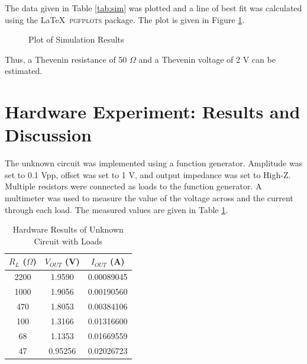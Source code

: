 \documentclass[EEEE]{KGCOEReport}
\begin{document}
The data given in Table \ref{tab:sim} was plotted and a line of best fit was
calculated using the \LaTeX \ \textsc{pgfplots} package. The plot is given in Figure
\ref{fig:sim-plot}.

\theorytbl

\begin{figure}[H]
	\center
	\caption{Plot of Simulation Results}
	\label{fig:sim-plot}
\end{figure}

Thus, a Thevenin resistance of 50 $\Omega$ and a Thevenin voltage of 2 V can be
estimated.

\section{Hardware Experiment: Results and Discussion}

The unknown circuit was implemented using a function generator. Amplitude was
set to 0.1 Vpp, offset was set to 1 V, and output impedance was set to High-Z.
Multiple resistors were connected as loads to the function generator. A
multimeter was used to measure the value of the voltage across and the current
through each load. The measured values are given in Table \ref{tab:hw}.

\begin{table}[H]
	\center
	\caption{Hardware Results of Unknown Circuit with Loads}
	\begin{tabular}{|c|c|c|}
		\hline
		$R_L$ ($\Omega$) & $V_{OUT}$ (V) & $I_{OUT}$ (A) \\
		\hline
		\hline
		2200             & 1.9590        & 0.00089045    \\
		\hline
		1000             & 1.9056        & 0.00190560    \\
		\hline
		470              & 1.8053        & 0.00384106    \\
		\hline
		100              & 1.3166        & 0.01316600    \\
		\hline
		68               & 1.1353        & 0.01669559    \\
		\hline
		47               & 0.95256       & 0.02026723    \\
		\hline
	\end{tabular}
	\label{tab:hw}
\end{table}
\end{document}

